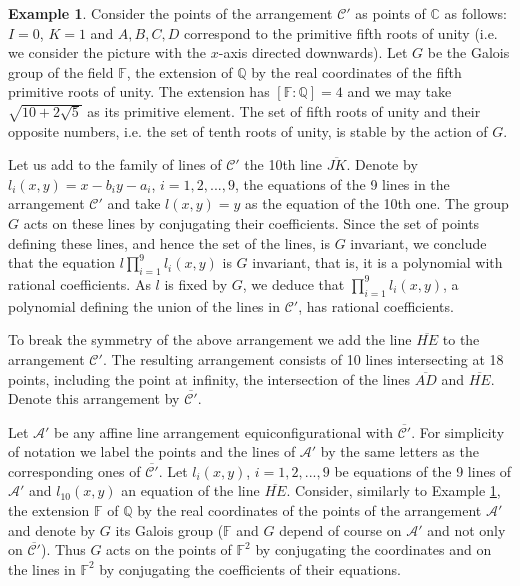 \documentclass[12pt]{amsart}
\theoremstyle{definition}
\newtheorem{example}[theorem]{Example}
\numberwithin{equation}{section}
\newcommand{\Q}{\mathbb{Q}}
\newcommand{\C}{\mathbb{C}}
\newcommand{\F}{\mathbb{F}}
\newcommand{\A}{\mathcal{A}}
\newcommand{\Car}{\mathcal{C}}
\begin{document}
\begin{example}\label{exmp:rational}
Consider the points of the arrangement $\mathcal C'$ as points of $\C$ as follows: 
$I=0$, $K=1$ and $A,B,C,D$ correspond to the primitive fifth roots of unity (i.e. we  consider the picture with the $x$-axis directed downwards). Let $G$ be the Galois group of the field $\F$, the extension of $\Q$ by the real coordinates of the fifth primitive roots of unity.  The extension has $[\F:\Q]=4$ and we may take $\sqrt{10+2\sqrt{5}}$ as its primitive element.  The set of fifth roots of unity and their  opposite numbers, i.e. the set of tenth roots of unity, is stable by the action of $G$.  

Let us add to the family of lines of $\mathcal C'$ the 10th line $\overline{JK}$.  
Denote by $l_i(x,y)= x - b_iy -a_i$, $i=1,2,. . . , 9$, the equations of the 9 lines in the arrangement $\mathcal C'$ and take 
$l(x,y)= y$ as the equation of the 10th one. The group $G$ acts on these lines by conjugating their coefficients.  Since the set of points defining these lines, and hence the set of the lines, is $G$ invariant, we conclude that the equation 
$l\prod_{i=1}^{9} l_i(x,y)$ is $G$ invariant, that is,  it is a polynomial with rational coefficients. As $l$ is fixed by $G$, we deduce that $ \prod_{i=1}^{9} l_i(x,y)$, 
a polynomial defining the union of the lines in $\mathcal C'$, has rational coefficients. 
\end{example}

To break the symmetry of the above arrangement %
we add the line $\overline{HE}$ to the arrangement $\mathcal C'$.   
The resulting arrangement consists of 10 lines intersecting at 18 points, including the point at infinity, the intersection of the lines $\overline {AD}$ and $\overline {HE}$.  Denote this arrangement by $\overline {\mathcal C'}$.   

Let $\A'$ be any affine line arrangement equiconfigurational with $\overline {\Car'}$.  
For simplicity of notation we label the points and the lines of $\A'$ by the same letters as the corresponding ones of $\overline {\mathcal C'}$.  
Let $l_i(x,y)$, $i=1, 2,. . . , 9$ be equations of the 9 lines of $\A'$ and  $l_{10}(x,y)$ an equation of the line $\overline{HE}$.  
Consider, similarly to Example \ref{exmp:rational},  the extension $\F$ of $\Q$ by the real coordinates of the points of the arrangement $\A'$ and denote by $G$ its Galois group ($\F$ and $G$ depend of course on $\A'$ and not only on $\overline {\Car'}$). Thus $G$ acts on the points of $\F^2$ by conjugating the coordinates and on the lines in $\F^2$ by conjugating the coefficients of their equations.
\end{document}
